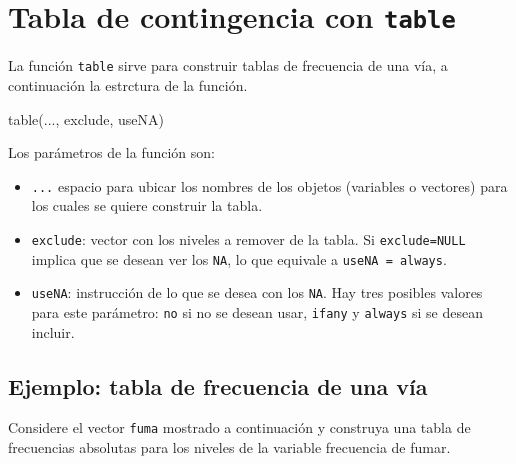 \documentclass[
]{book}
\makeatletter
\newenvironment{Shaded}{\begin{snugshade}}{\end{snugshade}}
\newcommand{\FunctionTok}[1]{\textcolor[rgb]{0.00,0.00,0.00}{#1}}
\newcommand{\NormalTok}[1]{#1}
\providecommand{\tightlist}{%
  \setlength{\itemsep}{0pt}\setlength{\parskip}{0pt}}
\newenvironment{kframe}{%
\medskip{}
\setlength{\fboxsep}{.8em}
 \def\at@end@of@kframe{}%
 \ifinner\ifhmode%
  \def\at@end@of@kframe{\end{minipage}}%
  \begin{minipage}{\columnwidth}%
 \fi\fi%
 \def\FrameCommand##1{\hskip\@totalleftmargin \hskip-\fboxsep
 \colorbox{shadecolor}{##1}\hskip-\fboxsep
     \hskip-\linewidth \hskip-\@totalleftmargin \hskip\columnwidth}%
 \MakeFramed {\advance\hsize-\width
   \@totalleftmargin\z@ \linewidth\hsize
   \@setminipage}}%
 {\par\unskip\endMakeFramed%
 \at@end@of@kframe}
\renewenvironment{Shaded}{\begin{kframe}}{\end{kframe}}
\makeatother
\begin{document}
\hypertarget{tabla-de-contingencia-con-table}{%
\section{\texorpdfstring{Tabla de contingencia con \texttt{table} }{Tabla de contingencia con table }}\label{tabla-de-contingencia-con-table}}

La función \texttt{table} sirve para construir tablas de frecuencia de una vía, a continuación la estrctura de la función.

\begin{Shaded}
\begin{Highlighting}[]
\FunctionTok{table}\NormalTok{(..., exclude, useNA)}
\end{Highlighting}
\end{Shaded}

Los parámetros de la función son:

\begin{itemize}
\tightlist
\item
  \texttt{...} espacio para ubicar los nombres de los objetos (variables o vectores) para los cuales se quiere construir la tabla.
\item
  \texttt{exclude}: vector con los niveles a remover de la tabla. Si \texttt{exclude=NULL} implica que se desean ver los \texttt{NA}, lo que equivale a \texttt{useNA\ =\ \textquotesingle{}always\textquotesingle{}}.
\item
  \texttt{useNA}: instrucción de lo que se desea con los \texttt{NA}. Hay tres posibles valores para este parámetro: \texttt{\textquotesingle{}no\textquotesingle{}} si no se desean usar, \texttt{\textquotesingle{}ifany\textquotesingle{}} y \texttt{\textquotesingle{}always\textquotesingle{}} si se desean incluir.
\end{itemize}

\hypertarget{ejemplo-tabla-de-frecuencia-de-una-vuxeda}{%
\subsection*{Ejemplo: tabla de frecuencia de una vía}\label{ejemplo-tabla-de-frecuencia-de-una-vuxeda}}

Considere el vector \texttt{fuma} mostrado a continuación y construya una tabla de frecuencias absolutas para los niveles de la variable frecuencia de fumar.
\end{document}
